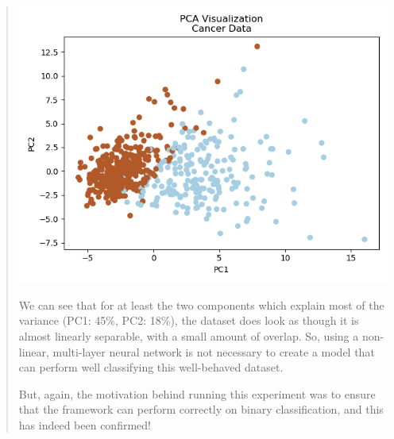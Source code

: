 \documentclass{article}
\begin{document}
\begin{quote}
	\begin{center}
		\includegraphics[scale=0.3]{figs/cancer_PCA.png}
	\end{center}
	
	We can see that for at least the two components which explain most of the variance (PC1: 45\%, PC2: 18\%), the dataset does look as though it is almost linearly separable, with a small amount of overlap. So, using a non-linear, multi-layer neural network is not necessary to create a model that can perform well classifying this well-behaved dataset. 
	
	But, again, the motivation behind running this experiment was to ensure that the framework can perform correctly on binary classification, and this has indeed been confirmed!
	
\end{quote}
\end{document}
